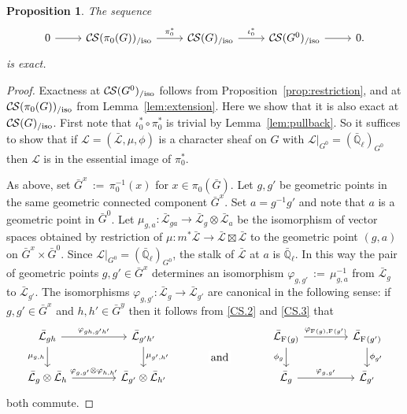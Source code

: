 \documentclass[10pt]{amsart}
\theoremstyle{plain}
\newtheorem{proposition}[theorem]{Proposition}
\theoremstyle{definition}
\newcommand{\EE}{\mathbb{\bar Q}_\ell}
\newcommand{\Frob}[1]{\operatorname{F}_{#1}}
\newcommand{\ceq}{{\, :=\, }}
\newcommand{\cs}[1]{{\mathcal{#1}}}
\newcommand{\gcs}[1]{{\mathcal{\bar #1}}}
\newcommand{\CS}{{\mathcal{C\hskip-0.8pt S}}}
\newcommand{\CSiso}[1]{\CS(#1)_{/\text{iso}}}
\newcommand{\bG}{\bar{G}}
\begin{document}
\begin{proposition}\label{prop:middleexact}
 The sequence
 \[
  \begin{tikzcd}
  0 \rar & \CSiso{\pi_0(G)} \arrow{r}{\pi_0^*} & \CSiso{G} \arrow{r}{\iota_0^*} & \CSiso{G^0} \rar & 0.
  \end{tikzcd}
 \]
 is exact.
\end{proposition}

\begin{proof}
Exactness at $\CSiso{G^0}$ follows from Proposition~\ref{prop:restriction},
and at $\CSiso{\pi_0(G)}$ from Lemma~\ref{lem:extension}.
Here we show that it is also exact at $\CSiso{G}$.
First note that $\iota_0^* \circ \pi_0^*$ is trivial by Lemma~\ref{lem:pullback}.
So it suffices to show that if $\cs{L} = (\gcs{L},\mu,\phi)$ is a character sheaf on $G$
with $\cs{L}\vert_{G^0} = (\EE)_{G^0}$ then $\cs{L}$ is in the essential image of $\pi_0^*$.

As above, set $\bG^x \ceq \pi_0^{-1}(x)$ for $x\in \pi_0(\bG)$.
Let $g, g'$ be geometric points in the same
geometric connected component $\bG^x$.
Set $a = g^{-1}g'$ and note that $a$ is a geometric point in $\bG^0$.
Let $\mu_{g,a} : \gcs{L}_{ga} \to \gcs{L}_g \otimes \gcs{L}_a$
be the isomorphism of vector spaces obtained by restriction of
$\mu : m^*\gcs{L} \to \gcs{L} \boxtimes \gcs{L}$ to the
geometric point $(g,a)$ on $\bG^x \times \bG^0$.
Since $\cs{L}\vert_{G^0} = (\EE)_{G^0}$,
the stalk of $\gcs{L}$ at $a$ is $\EE$.
In this way the pair of geometric points $g, g' \in \bG^x$
determines an isomorphism $\varphi_{g,g'} \ceq \mu_{g,a}^{-1}$
from $\gcs{L}_{g}$ to $\gcs{L}_{g'}$.
%
The isomorphisms $\varphi_{g,g'}: \gcs{L}_{g} \to \gcs{L}_{g'}$ are canonical
in the following sense: if $g,g'\in \bG^x$ and $h,h'\in \bG^y$
then it follows from \ref{CS.2} and \ref{CS.3}
that
 \begin{equation}\label{eq:CS}
  \begin{tikzcd}[column sep=40]
   \gcs{L}_{gh} \arrow{r}{\varphi_{gh,g'h'}} \arrow[swap]{d}{\mu_{g,h}}
  & \gcs{L}_{g'h'} \arrow{d}{\mu_{g',h'}}
  &\arrow[draw=none]{d}[pos=.4,description]{\text{\normalsize{and}}}
  &  \gcs{L}_{\Frob{}(g)} \arrow{r}{\varphi_{\Frob{}(g),\Frob{}(g')}} \arrow[swap]{d}{\phi_{g}} & \gcs{L}_{\Frob{}(g')} \arrow{d}{\phi_{g'}} \\
  \gcs{L}_{g} \otimes \gcs{L}_{h} \arrow{r}{\varphi_{g,g'}\otimes \varphi_{h,h'}}
  & \gcs{L}_{g'} \otimes \gcs{L}_{h'}
  & {}
  & \gcs{L}_{g} \arrow{r}{\varphi_{g,g'}} & \gcs{L}_{g'}
  \end{tikzcd}
 \end{equation}
both commute.


\end{proof}
\end{document}
